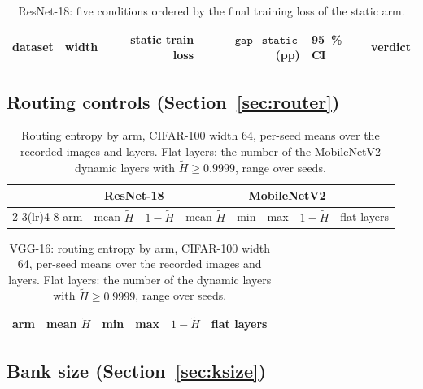 \documentclass[10pt,a4paper]{article}
\begin{document}
\begin{table}[!htbp]\centering\small
\caption{ResNet-18: five conditions ordered by the final training loss of the
static arm.}
\label{tab:satur}
\begin{tabular}{l r r rl l}
\toprule
dataset & width & static train loss & $\texttt{gap}-\texttt{static}$ (pp) & \SI{95}{\percent} CI & verdict \\
\midrule
\bottomrule
\end{tabular}
\end{table}

\FloatBarrier

\subsection{Routing controls (Section~\ref{sec:router})}

\begin{table}[!htbp]\centering\small
\caption{Routing entropy by arm, CIFAR-100 width 64, per-seed means over
the recorded images and layers. Flat layers: the number of the
 MobileNetV2 dynamic layers with $\tilde H\ge0.9999$, range
over seeds.}
\label{tab:mbentw64}
\begin{tabular}{l rr rrrr r}
\toprule
& \multicolumn{2}{c}{ResNet-18} & \multicolumn{5}{c}{MobileNetV2} \\
\cmidrule(lr){2-3}\cmidrule(lr){4-8}
arm & mean $\tilde H$ & $1-\tilde H$ & mean $\tilde H$ & min & max & $1-\tilde H$ & flat layers \\
\midrule
\bottomrule
\end{tabular}
\end{table}

\begin{table}[!htbp]\centering\small
\caption{VGG-16: routing entropy by arm, CIFAR-100 width 64, per-seed
means over the recorded images and layers. Flat layers: the number of the
 dynamic layers with $\tilde H\ge0.9999$, range over seeds.}
\label{tab:vgentw64}
\begin{tabular}{l rrrr r}
\toprule
arm & mean $\tilde H$ & min & max & $1-\tilde H$ & flat layers \\
\midrule
\bottomrule
\end{tabular}
\end{table}

\FloatBarrier

\subsection{Bank size (Section~\ref{sec:ksize})}
\end{document}
